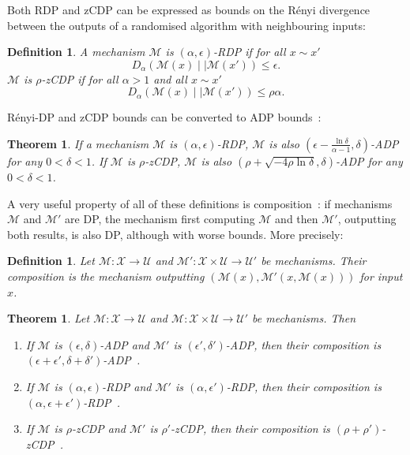 \documentclass[english,twoside,openright]{HYgraduMLDS}
\newtheorem{theorem}[lemma]{Theorem}
\newtheorem{definition}[lemma]{Definition}
\newcommand{\dmid}{\mid\mid}
\newcommand{\calm}{{\mathcal{M}}}
\newcommand{\calx}{{\mathcal{X}}}
\newcommand{\calu}{{\mathcal{U}}}
\begin{document}
Both RDP and zCDP can be expressed as bounds on the
Rényi divergence between the outputs of a randomised algorithm with
neighbouring inputs:

\begin{definition}
    A mechanism \(\calm\) is \((\alpha, \epsilon)\)-RDP
    if for all \(x \sim x'\)
    \[
        D_\alpha(\calm(x)\dmid \calm(x')) \leq \epsilon.
    \]
    \(\calm\) is \(\rho\)-zCDP if for all \(\alpha > 1\)
    and all \(x \sim x'\)
    \[
        D_\alpha(\calm(x)\dmid \calm(x')) \leq \rho \alpha.
    \]

\end{definition}

Rényi-DP and zCDP bounds can be converted to ADP bounds~\cite{Mironov17, BuS16}:
\begin{theorem}\label{other_dp_to_adp}
    If a mechanism \(\calm\) is \((\alpha, \epsilon)\)-RDP, \(\calm\) is also
    \((\epsilon - \frac{\ln \delta}{\alpha - 1}, \delta)\)-ADP for any 
    \(0 < \delta < 1\). If \(\calm\) is \(\rho\)-zCDP, \(\calm\) is also 
    \((\rho + \sqrt{-4\rho\ln \delta}, \delta)\)-ADP for any \(0 < \delta < 1\).
\end{theorem}

A very useful property of all of these definitions is composition~\cite{DwR14}: 
if mechanisms \(\calm\) and \(\calm'\) are DP, the mechanism first computing
\(\calm\) and then \(\calm'\), outputting both results, 
is also DP, although with worse bounds.
More precisely:

\begin{definition}\label{composition_definition}
    Let \(\calm\colon \calx \to \calu\) and 
    \(\calm'\colon \calx\times \calu \to \calu'\) be mechanisms.
    Their composition is the mechanism outputting
    \((\calm(x), \calm'(x, \calm(x)))\) for input \(x\).
\end{definition}

\begin{theorem}\label{composition-theorem}
    Let \(\calm\colon \calx \to \calu\) and 
    \(\calm\colon \calx\times \calu \to \calu'\) be mechanisms. Then
    \begin{enumerate}
        \item 
            If \(\calm\) is \((\epsilon, \delta)\)-ADP and 
            \(\calm'\) is \((\epsilon', \delta')\)-ADP, then 
            their composition is 
            \((\epsilon + \epsilon', \delta + \delta')\)-ADP~\cite{DKM06}.
        \item 
            If \(\calm\) is \((\alpha, \epsilon)\)-RDP and 
            \(\calm'\) is \((\alpha, \epsilon')\)-RDP, then 
            their composition is \((\alpha, \epsilon + \epsilon')\)-RDP~\cite{Mironov17}.
        \item 
            If \(\calm\) is \(\rho\)-zCDP and 
            \(\calm'\) is \(\rho'\)-zCDP, then 
            their composition is \((\rho + \rho')\)-zCDP~\cite{BuS16}.
    \end{enumerate}
\end{theorem}
\end{document}

